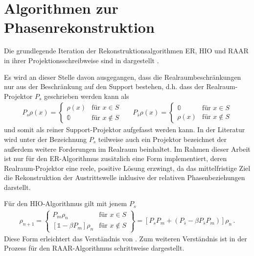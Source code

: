 \chapter{Algorithmen zur Phasenrekonstruktion}
\label{app:algos}
Die grundlegende Iteration der Rekonstruktionsalgorithmen ER, HIO und RAAR in ihrer Projektionsschreibweise sind in  dargestellt \cite{fienup1978,luke2004,marchesini2007}.

Es wird an dieser Stelle davon ausgegangen, dass die Realraumbeschränkungen nur aus der Beschränkung auf den Support bestehen, d.h. dass der Realraum-Projektor $P_s$ geschrieben werden kann als 
\begin{align*}
	P_s\rho (x)=\begin{cases}
	\rho (x)  &\text{für } x\in S\\
	\mathbb{0}  &\text{für }x\notin S
	\end{cases} &   &   
	P_{\bar{s}}\rho (x)=\begin{cases}
	\mathbb{0} &\text{für } x\in S\\
	\rho (x)   &\text{für }x\notin S
	\end{cases}
\end{align*}
und somit als reiner Support-Projektor aufgefasst werden kann. In der Literatur wird unter der Bezeichnung $P_s$ teilweise auch ein Projektor bezeichnet der außerdem weitere Forderungen im Realraum beinhaltet. Im Rahmen dieser Arbeit ist nur für den ER-Algorithmus zusätzlich eine Form implementiert, deren Realraum-Projektor eine reele, positive Lösung erzwingt, da das mittelfristige Ziel die Rekonstruktion der Austrittswelle inklusive der relativen Phasenbeziehungen darstellt.
 
Für den HIO-Algorithmus gilt mit jenem $P_s$ 
\begin{align*}
	\rho_{n+1}=\left.
	\begin{cases}	
	P_m\rho_n                               & \text{für } x\in S    \\
	\left[\mathbb{1}-\beta P_m\right]\rho_n & \text{für } x\notin S 
	\end{cases}	
	\right\}=\left[P_sP_m+\left(P_{\bar{s}}-\beta P_{\bar{s}} P_m\right)\right]\rho_n
	\,.
\end{align*}
Diese Form erleichtert das Verständnis von . Zum weiteren Verständnis ist in  der Prozess für den RAAR-Algorithmus schrittweise dargestellt.
	
